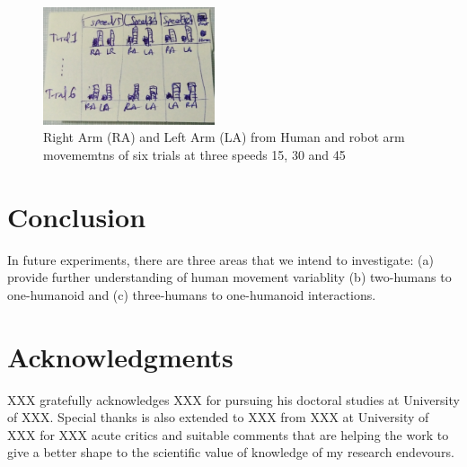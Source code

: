 \documentclass{sigchi}
\begin{document}
\begin{figure}[!htb]
\centering
\includegraphics[width=0.45\textwidth]{figures/results/imus}
\caption[PA]{Right Arm (RA) and Left Arm (LA) from Human and robot arm movememtns
of six trials at three speeds 15, 30 and 45}
\label{fig:imus}
\end{figure}






\section{Conclusion}



In future experiments, there are three areas that we intend to investigate:
(a) provide further understanding of human movement variablity
(b) two-humans to one-humanoid and
(c) three-humans to one-humanoid interactions.







\section{Acknowledgments}

XXX gratefully acknowledges XXX for pursuing his doctoral studies at
University of XXX. Special thanks is also extended to XXX from XXX at
University of XXX for XXX
acute critics and suitable comments that are helping the work to give a better
shape to the scientific value of knowledge of my research endevours.


%
%
%
%
%
\balance{}

\balance{}



\end{document}
